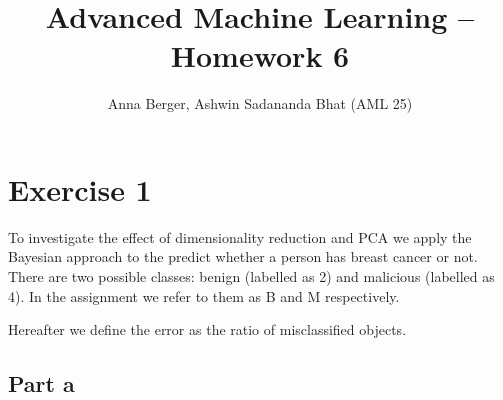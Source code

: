 \documentclass[11pt,a4paper]{article}
\title{\textbf{Advanced Machine Learning -- Homework 6}}
\author{Anna Berger, Ashwin Sadananda Bhat (AML 25)}
\begin{document}
\maketitle
  
 \section*{Exercise 1}
 To investigate the effect of dimensionality reduction and PCA we apply the Bayesian approach to the predict whether a person has breast cancer or not. There are two possible classes: benign (labelled as 2) and malicious (labelled as 4). In the assignment we refer to them as B and M respectively.
 
 Hereafter we define the error as the ratio of misclassified objects.
 
 \subsection*{Part a}
 
\end{document}
